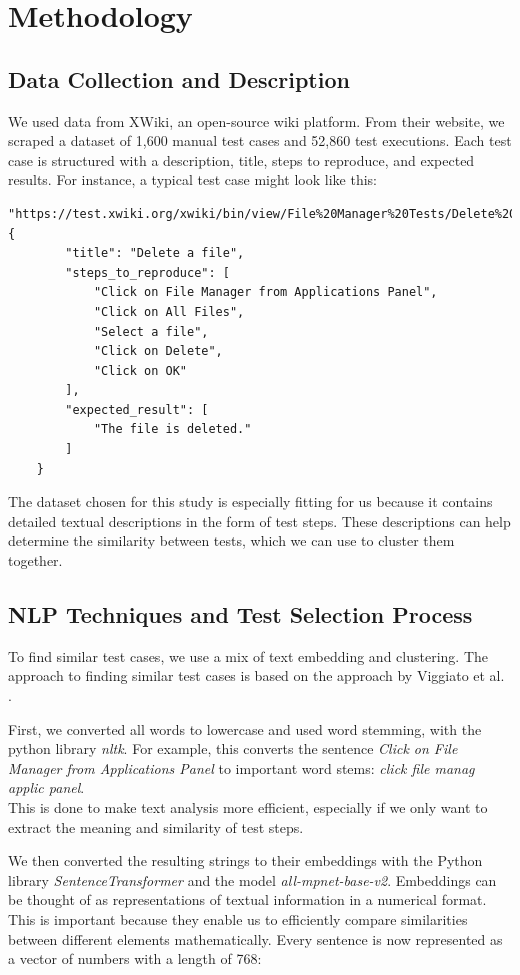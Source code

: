 \section{Methodology}
\subsection{Data Collection and Description}
We used data from XWiki, an open-source wiki platform. From their website, we scraped a dataset of 1,600 manual test cases and 52,860 test executions. Each test case is structured with a description, title, steps to reproduce, and expected results. For instance, a typical test case might look like this:

\begin{Verbatim}[fontsize=\small]
    "https://test.xwiki.org/xwiki/bin/view/File%20Manager%20Tests/Delete%20a%20file": {
        "title": "Delete a file",
        "steps_to_reproduce": [
            "Click on File Manager from Applications Panel",
            "Click on All Files",
            "Select a file",
            "Click on Delete",
            "Click on OK"
        ],
        "expected_result": [
            "The file is deleted."
        ]
    }
\end{Verbatim}

The dataset chosen for this study is especially fitting for us because it contains detailed textual descriptions in the form of test steps. These descriptions can help determine the similarity between tests, which we can use to cluster them together.

\subsection{\ac{NLP} Techniques and Test Selection Process}

To find similar test cases, we use a mix of text embedding and clustering. The approach to finding similar test cases is based on the approach by Viggiato et al. \cite{Viggiato}.

First, we converted all words to lowercase and used word stemming, with the python library \emph{nltk}.
For example, this converts the sentence \emph{Click on File Manager from Applications Panel} to important word stems: \emph{click file manag applic panel}. \\
This is done to make text analysis more efficient, especially if we only want to extract the meaning and similarity of test steps.

We then converted the resulting strings to their embeddings with the Python library \emph{SentenceTransformer} and the model \emph{all-mpnet-base-v2}. Embeddings can be thought of as representations of textual information in a numerical format. This is important because they enable us to efficiently compare similarities between different elements mathematically.
Every sentence is now represented as a vector of numbers with a length of 768:

